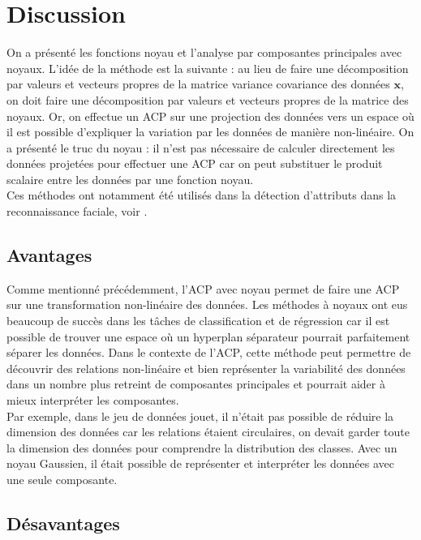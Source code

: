 \section{Discussion}

On a présenté les fonctions noyau et l'analyse par composantes principales avec noyaux. L'idée de la méthode est la suivante : au lieu de faire une décomposition par valeurs et vecteurs propres de la matrice variance covariance des données $\textbf{x}$, on doit faire une décomposition par valeurs et vecteurs propres de la matrice des noyaux. Or, on effectue un ACP sur une projection des données vers un espace où il est possible d'expliquer la variation par les données de manière non-linéaire. On a présenté le truc du noyau : il n'est pas nécessaire de calculer directement les données projetées pour effectuer une ACP car on peut substituer le produit scalaire entre les données par une fonction noyau. \\

Ces méthodes ont notamment été utilisés dans la détection d'attributs dans la reconnaissance faciale, voir \cite{kim2002face}. 

\subsection{Avantages}

Comme mentionné précédemment, l'ACP avec noyau permet de faire une ACP sur une transformation non-linéaire des données. Les méthodes à noyaux ont eus beaucoup de succès dans les tâches de classification et de régression car il est possible de trouver une espace où un hyperplan séparateur pourrait parfaitement séparer les données. Dans le contexte de l'ACP, cette méthode peut permettre de découvrir des relations non-linéaire et bien représenter la variabilité des données dans un nombre plus retreint de composantes principales et pourrait aider à mieux interpréter les composantes. \\

Par exemple, dans le jeu de données jouet, il n'était pas possible de réduire la dimension des données car les relations étaient circulaires, on devait garder toute la dimension des données pour comprendre la distribution des classes. Avec un noyau Gaussien, il était possible de représenter et interpréter les données avec une seule composante.

\subsection{Désavantages}

